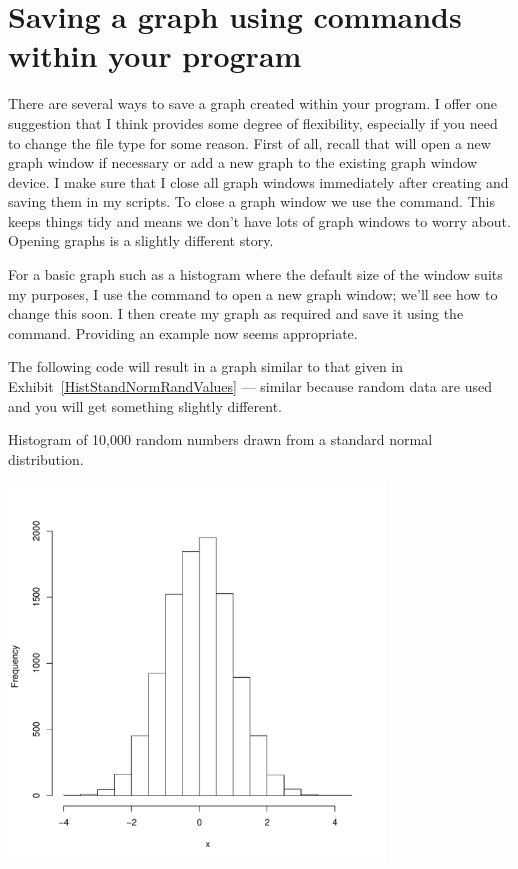 \section{Saving a graph using commands within your \R{} program}

There are several ways to save a graph created within your \R{} program. I offer one suggestion that I think provides some degree of flexibility, especially if you need to change the file type for some reason. First of all, recall that \R{} will open a new graph window if necessary or add a new graph to the existing graph window device. I make sure that I close all graph windows immediately after creating and saving them in my \R{} scripts. To close a graph window we use the  command. This keeps things tidy and means we don't have lots of graph windows to worry about. Opening graphs is a slightly different story.

For a basic graph such as a histogram where the default size of the window suits my purposes, I use the  command to open a new graph window; we'll see how to change this soon. I then create my graph as required and save it using the  command. Providing an example now seems appropriate. 

The following code will result in a graph similar to that given in Exhibit~\ref{HistStandNormRandValues} --- similar because random data are used and you will get something slightly different.\begin{exhibit}
\begin{center}
\caption{Histogram of 10,000 random numbers drawn from a standard normal distribution. \label{HistStandNormRandValues}}
\includegraphics[width=10cm]{figures/StoreResultsHistRand10000Z-1}
\end{center}
\end{exhibit}


